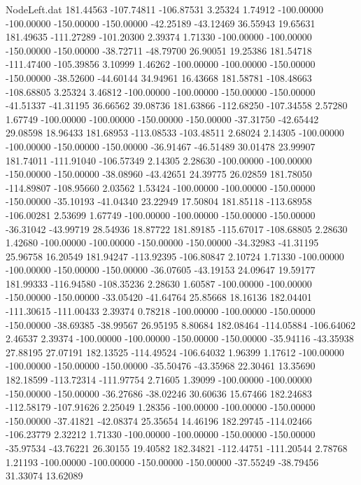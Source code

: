 \begin{filecontents}{NodeLeft.dat}
 181.44563 -107.74811 -106.87531     3.25324    1.74912 -100.00000 -100.00000 -150.00000 -150.00000  -42.25189  -43.12469   36.55943   19.65631
 181.49635 -111.27289 -101.20300     2.39374    1.71330 -100.00000 -100.00000 -150.00000 -150.00000  -38.72711  -48.79700   26.90051   19.25386
 181.54718 -111.47400 -105.39856     3.10999    1.46262 -100.00000 -100.00000 -150.00000 -150.00000  -38.52600  -44.60144   34.94961   16.43668
 181.58781 -108.48663 -108.68805     3.25324    3.46812 -100.00000 -100.00000 -150.00000 -150.00000  -41.51337  -41.31195   36.66562   39.08736
 181.63866 -112.68250 -107.34558     2.57280    1.67749 -100.00000 -100.00000 -150.00000 -150.00000  -37.31750  -42.65442   29.08598   18.96433
 181.68953 -113.08533 -103.48511     2.68024    2.14305 -100.00000 -100.00000 -150.00000 -150.00000  -36.91467  -46.51489   30.01478   23.99907
 181.74011 -111.91040 -106.57349     2.14305    2.28630 -100.00000 -100.00000 -150.00000 -150.00000  -38.08960  -43.42651   24.39775   26.02859
 181.78050 -114.89807 -108.95660     2.03562    1.53424 -100.00000 -100.00000 -150.00000 -150.00000  -35.10193  -41.04340   23.22949   17.50804
 181.85118 -113.68958 -106.00281     2.53699    1.67749 -100.00000 -100.00000 -150.00000 -150.00000  -36.31042  -43.99719   28.54936   18.87722
 181.89185 -115.67017 -108.68805     2.28630    1.42680 -100.00000 -100.00000 -150.00000 -150.00000  -34.32983  -41.31195   25.96758   16.20549
 181.94247 -113.92395 -106.80847     2.10724    1.71330 -100.00000 -100.00000 -150.00000 -150.00000  -36.07605  -43.19153   24.09647   19.59177
 181.99333 -116.94580 -108.35236     2.28630    1.60587 -100.00000 -100.00000 -150.00000 -150.00000  -33.05420  -41.64764   25.85668   18.16136
 182.04401 -111.30615 -111.00433     2.39374    0.78218 -100.00000 -100.00000 -150.00000 -150.00000  -38.69385  -38.99567   26.95195    8.80684
 182.08464 -114.05884 -106.64062     2.46537    2.39374 -100.00000 -100.00000 -150.00000 -150.00000  -35.94116  -43.35938   27.88195   27.07191
 182.13525 -114.49524 -106.64032     1.96399    1.17612 -100.00000 -100.00000 -150.00000 -150.00000  -35.50476  -43.35968   22.30461   13.35690
 182.18599 -113.72314 -111.97754     2.71605    1.39099 -100.00000 -100.00000 -150.00000 -150.00000  -36.27686  -38.02246   30.60636   15.67466
 182.24683 -112.58179 -107.91626     2.25049    1.28356 -100.00000 -100.00000 -150.00000 -150.00000  -37.41821  -42.08374   25.35654   14.46196
 182.29745 -114.02466 -106.23779     2.32212    1.71330 -100.00000 -100.00000 -150.00000 -150.00000  -35.97534  -43.76221   26.30155   19.40582
 182.34821 -112.44751 -111.20544     2.78768    1.21193 -100.00000 -100.00000 -150.00000 -150.00000  -37.55249  -38.79456   31.33074   13.62089

\end{filecontents}
